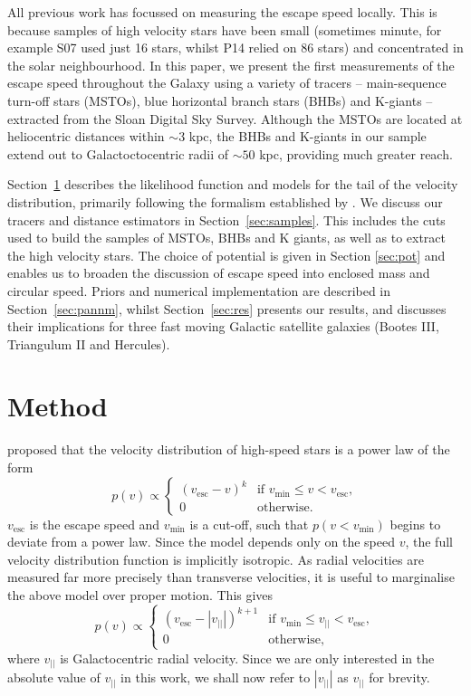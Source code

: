 \documentclass[useAMS,twocolumn,usenatbib]{mn2e}
\def\vlos{{v_{||}}}
\def\vesc{{v_\mathrm{esc}}}
\def\vmin{{v_\mathrm{min}}}
\begin{document}
All previous work has focussed on measuring the escape speed locally. 
This is because samples of high velocity stars have been small (sometimes minute, for example S07 used just 16 stars, whilst P14 relied on 86 stars) and concentrated in the solar neighbourhood.
In this paper, we present the first measurements of the escape speed throughout the Galaxy using a variety of tracers -- main-sequence turn-off stars (MSTOs), blue horizontal branch stars (BHBs) and K-giants -- extracted from the Sloan Digital Sky Survey.
Although the MSTOs are located at heliocentric distances within $\sim 3$ kpc, the BHBs and K-giants in our sample extend out to Galactoctocentric radii of $\sim 50$ kpc, providing much greater reach.

Section~\ref{sec:method} describes the likelihood function and models for the tail of the velocity distribution, primarily following the formalism established by \citet{Le90}. 
We discuss our tracers and distance estimators in Section~\ref{sec:samples}. 
This includes the cuts used to build the samples of MSTOs, BHBs and K giants, as well as to extract the high velocity stars. 
The choice of potential is given in Section \ref{sec:pot} and enables us to broaden the discussion of escape speed into enclosed mass and circular speed. 
Priors and numerical implementation are described in Section~\ref{sec:pannm}, whilst Section~\ref{sec:res} presents our results, and discusses their implications for three fast moving Galactic satellite galaxies (Bootes III, Triangulum II and Hercules).

\section{Method}

\label{sec:method}

\cite{Le90} proposed that the velocity distribution of high-speed stars is a power law of the form
%
\begin{equation}
  p(v)\propto\begin{cases}
    (\vesc - v)^k & \text{if $\vmin \leq v<\vesc$},\\
    0 & \text{otherwise}.
  \end{cases}
  \label{eq:lt90}
\end{equation}
%
$\vesc$ is the escape speed and $\vmin$ is a cut-off, such that $p(v < \vmin)$ begins to deviate from a power law. 
Since the model depends only on the speed $v$, the full velocity distribution function is implicitly isotropic. 
As radial velocities are measured far more precisely than transverse velocities, it is useful to marginalise the above model over proper motion. 
This gives
%
\begin{equation}
  p(v)\propto\begin{cases}
    (\vesc - |\vlos|)^{k+1} & \text{if $\vmin \leq \vlos <\vesc$},\\
    0 & \text{otherwise},
  \end{cases}
\end{equation}
%
where $\vlos$ is Galactocentric radial velocity. 
Since we are only interested in the absolute value of $\vlos$ in this work, we shall now refer to $|\vlos|$ as $\vlos$ for brevity.
\end{document}
